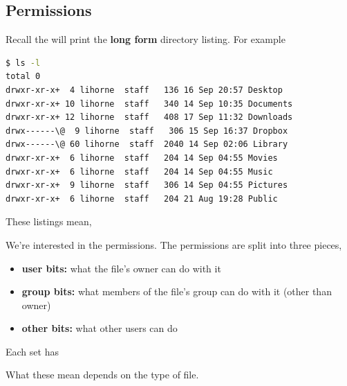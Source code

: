 \documentclass[english, 11pt]{article}
\begin{document}
   \subsection{Permissions}

   Recall the  will print the \textbf{long form} directory listing. For example
   \begin{lstlisting}[language=bash,numbers=none]
$ ls -l
total 0
drwxr-xr-x+  4 lihorne  staff   136 16 Sep 20:57 Desktop
drwxr-xr-x+ 10 lihorne  staff   340 14 Sep 10:35 Documents
drwxr-xr-x+ 12 lihorne  staff   408 17 Sep 11:32 Downloads
drwx------\@  9 lihorne  staff   306 15 Sep 16:37 Dropbox
drwx------\@ 60 lihorne  staff  2040 14 Sep 02:06 Library
drwxr-xr-x+  6 lihorne  staff   204 14 Sep 04:55 Movies
drwxr-xr-x+  6 lihorne  staff   204 14 Sep 04:55 Music
drwxr-xr-x+  9 lihorne  staff   306 14 Sep 04:55 Pictures
drwxr-xr-x+  6 lihorne  staff   204 21 Aug 19:28 Public
   \end{lstlisting}

   These listings mean,
   \begin{center}
   \end{center}

   We're interested in the permissions. The permissions are split into three pieces,
   \begin{center}
   \end{center}
   \begin{itemize}
     \item \textbf{user bits:} what the file's owner can do with it
     \item \textbf{group bits:} what members of the file's group can do with it (other than owner)
     \item \textbf{other bits:} what other users can do
   \end{itemize}
   Each set has
    \begin{center}
  \end{center}
  What these mean depends on the type of file. \\
\end{document}
